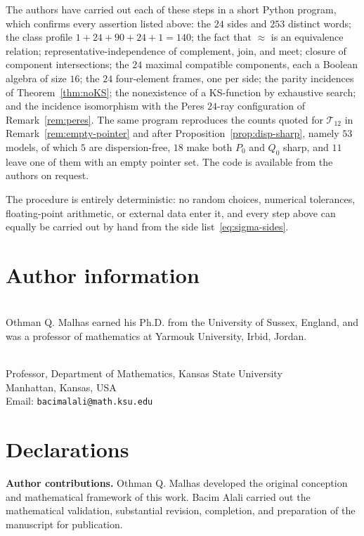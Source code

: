 \documentclass{article}   	%
\theoremstyle{plain}
\theoremstyle{definition}
\theoremstyle{remark}
\begin{document}
The authors have carried out each of these steps in a short Python program,
which confirms every assertion listed above: the $24$ sides and $253$ distinct
words; the class profile $1+24+90+24+1=140$; the fact that $\approx$ is an
equivalence relation; representative-independence of complement, join, and meet;
closure of component intersections; the $24$ maximal compatible components, each
a Boolean algebra of size $16$; the $24$ four-element frames, one per side; the
parity incidences of Theorem~\ref{thm:noKS}; the nonexistence of a KS-function
by exhaustive search; and the incidence isomorphism with the Peres $24$-ray
configuration of Remark~\ref{rem:peres}.  The same program reproduces the counts
quoted for $\mathcal T_{12}$ in Remark~\ref{rem:empty-pointer} and after
Proposition~\ref{prop:disp-sharp}, namely $53$ models, of which $5$ are
dispersion-free, $18$ make both $P_0$ and $Q_0$ sharp, and $11$ leave one of them
with an empty pointer set.  The code is available from the authors on request.

The procedure is entirely deterministic: no random choices, numerical
tolerances, floating-point arithmetic, or external data enter it, and every
step above can equally be carried out by hand from the side
list~\eqref{eq:sigma-sides}.

\section*{Author information}

\\
Othman Q. Malhas earned his Ph.D. from the University of Sussex,
England, and was a professor of mathematics at Yarmouk University,
Irbid, Jordan.

\medskip

\\
Professor, Department of Mathematics, Kansas State University\\
Manhattan, Kansas, USA\\
Email: \texttt{bacimalali@math.ksu.edu}

\section*{Declarations}

\noindent\textbf{Author contributions.}
Othman Q. Malhas developed the original conception and mathematical
framework of this work. Bacim Alali carried out the mathematical
validation, substantial revision, completion, and preparation of the
manuscript for publication.
\end{document}
